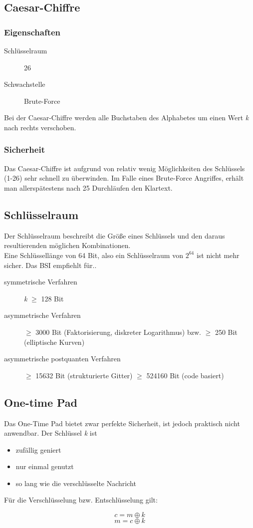 \documentclass{report}
\begin{document}
\subsection{Caesar-Chiffre}
\subsubsection{Eigenschaften}
\begin{description}
    \item[Schlüsselraum] 26
    \item[Schwachstelle] Brute-Force  
\end{description}
Bei der Caesar-Chiffre werden alle Buchstaben des Alphabetes um einen Wert \textit{k} nach rechts verschoben.
\subsubsection{Sicherheit}
Das Caesar-Chiffre ist aufgrund von relativ wenig Möglichkeiten des Schlüssels (1-26) sehr schnell zu überwinden. Im Falle eines Brute-Force
Angriffes, erhält man allerspätestens nach 25 Durchläufen den Klartext.

\subsection{Schlüsselraum}
Der Schlüsselraum beschreibt die Größe eines Schlüssels und den daraus resultierenden möglichen Kombinationen. \\
Eine Schlüssellänge von 64 Bit, also ein Schlüsselraum von $ 2^{64} $ ist nicht mehr sicher.
Das BSI empfiehlt für..
\begin{description}
    \item[symmetrische Verfahren] \textit{k} $\ge$ 128 Bit
    \item[asymmetrische Verfahren] $\ge$ 3000 Bit (Faktorisierung, diskreter Logarithmus) bzw. $\ge$ 250 Bit (elliptische Kurven) 
    \item[asymmetrische postquanten Verfahren] $\ge$ 15632 Bit (strukturierte Gitter) $\ge$ 524160 Bit (code basiert)
\end{description}
\subsection{One-time Pad}
Das One-Time Pad bietet zwar perfekte Sicherheit, ist jedoch praktisch nicht anwendbar.
Der Schlüssel \textit{k} ist 
\begin{itemize}
    \item zufällig geniert
    \item nur einmal genutzt
    \item so lang wie die verschlüsselte Nachricht
\end{itemize}
Für die Verschlüsselung bzw. Entschlüsselung gilt:
\begin{center}
    $$ c = m \oplus k $$
    $$ m = c \oplus k $$
\end{center}
\end{document}
